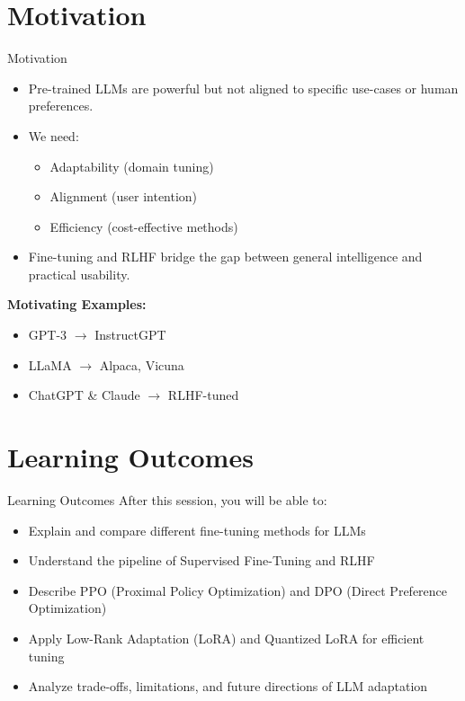 \section{Motivation}
\begin{frame}{Motivation}
    \begin{itemize}
        \item Pre-trained LLMs are powerful but not aligned to specific use-cases or human preferences.
        \item We need:
        \begin{itemize}
            \item Adaptability (domain tuning)
            \item Alignment (user intention)
            \item Efficiency (cost-effective methods)
        \end{itemize}
        \item Fine-tuning and RLHF bridge the gap between general intelligence and practical usability.
    \end{itemize}

    \textbf{Motivating Examples:}
    \begin{itemize}
        \item GPT-3 $\rightarrow$ InstructGPT
        \item LLaMA $\rightarrow$ Alpaca, Vicuna
        \item ChatGPT \& Claude $\rightarrow$ RLHF-tuned
    \end{itemize}
\end{frame}


\section{Learning Outcomes}
\begin{frame}{Learning Outcomes}
    After this session, you will be able to:
    \begin{itemize}
        \item Explain and compare different fine-tuning methods for LLMs
        \item Understand the pipeline of Supervised Fine-Tuning and RLHF
        \item Describe PPO (Proximal Policy Optimization) and DPO (Direct Preference Optimization)
        \item Apply Low-Rank Adaptation (LoRA) and Quantized LoRA for efficient tuning
        \item Analyze trade-offs, limitations, and future directions of LLM adaptation
    \end{itemize}
\end{frame}


